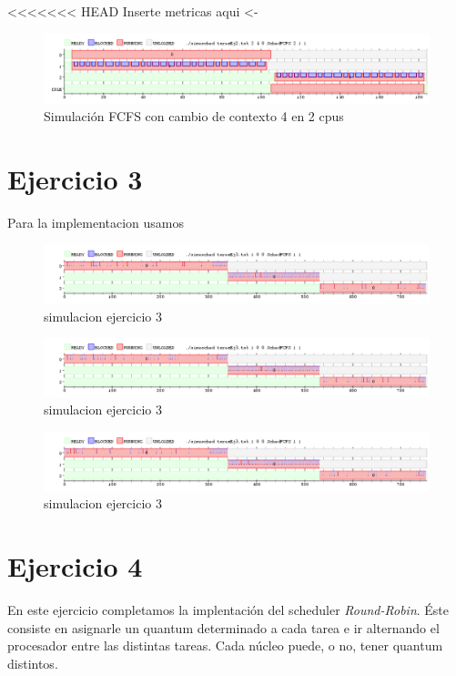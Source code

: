 \documentclass[11pt]{article}
\begin{document}
<<<<<<< HEAD
  Inserte metricas aqui <-

  \begin{figure}[H]
    \includegraphics[scale=0.5]{Ejercicio2_2cpu}
    \caption{Simulación FCFS con cambio de contexto 4 en 2 cpus}
  \end{figure}

\section{Ejercicio 3}
  Para la implementacion usamos
  \begin{figure}[H]
    \includegraphics[scale=0.5]{Ejercicio3_1}
    \caption{simulacion ejercicio 3}
  \end{figure}

  \begin{figure}[H]
    \includegraphics[scale=0.5]{Ejercicio3_2}
    \caption{simulacion ejercicio 3}
  \end{figure}

  \begin{figure}[H]
    \includegraphics[scale=0.5]{Ejercicio3_3}
    \caption{simulacion ejercicio 3}
  \end{figure}
\newpage

\section{Ejercicio 4}

En este ejercicio completamos la implentación del scheduler \textit{Round-Robin}. Éste consiste en asignarle un quantum determinado a cada tarea e ir alternando el procesador entre las distintas tareas. Cada núcleo puede, o no, tener quantum distintos. 
\end{document}
